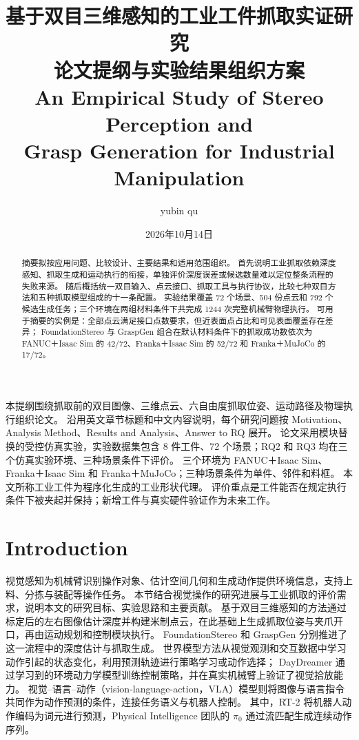 \documentclass[UTF8,fontset=fandol,a4paper,11pt]{ctexart}
\title{基于双目三维感知的工业工件抓取实证研究\\[.3em]
\large 论文提纲与实验结果组织方案\\[.4em]
An Empirical Study of Stereo Perception and\\
Grasp Generation for Industrial Manipulation}
\author{yubin qu}
\date{2026年10月14日}
\newcommand{\qyb}[1]{\textcolor{red!75!black}{#1}}
\begin{document}
\maketitle
\pagestyle{plain}

本提纲围绕抓取前的双目图像、三维点云、六自由度抓取位姿、运动路径及物理执行组织论文。
沿用英文章节标题和中文内容说明，每个研究问题按 Motivation、Analysis Method、Results and Analysis、Answer to RQ 展开。
论文采用模块替换的受控仿真实验，实验数据集包含 8 件工件、72 个场景；RQ2 和 RQ3 均在三个仿真实验环境、三种场景条件下评价。
三个环境为 FANUC＋Isaac Sim、Franka＋Isaac Sim 和 Franka＋MuJoCo；三种场景条件为单件、邻件和料框。
本文所称工业工件为程序化生成的工业形状代理。
评价重点是工件能否在规定执行条件下被夹起并保持；新增工件与真实硬件验证作为未来工作。

\begin{abstract}
摘要拟按应用问题、比较设计、主要结果和适用范围组织。
首先说明工业抓取依赖深度感知、抓取生成和运动执行的衔接，单独评价深度误差或候选数量难以定位整条流程的失败来源。
随后概括统一双目输入、点云接口、抓取工具与执行协议，比较七种双目方法和五种抓取模型组成的十一条配置。
实验结果覆盖 72 个场景、504 份点云和 792 个候选生成任务；三个环境在两组材料条件下共完成 1244 次完整机械臂物理执行。
可用于摘要的实例是：全部点云满足接口点数要求，但近表面点占比和可见表面覆盖存在差异；
FoundationStereo 与 GraspGen 组合在默认材料条件下的抓取成功数依次为 FANUC＋Isaac Sim 的 42/72、Franka＋Isaac Sim 的 52/72 和 Franka＋MuJoCo 的 17/72。
\end{abstract}

\section{\qyb{Introduction}}
\label{sec:intro}

视觉感知为机械臂识别操作对象、估计空间几何和生成动作提供环境信息，支持上料、分拣与装配等操作任务。
本节结合视觉操作的研究进展与工业抓取的评价需求，说明本文的研究目标、实验思路和主要贡献。
基于双目三维感知的方法通过标定后的左右图像估计深度并构建米制点云，在此基础上生成抓取位姿与夹爪开口，再由运动规划和控制模块执行。
FoundationStereo 和 GraspGen 分别推进了这一流程中的深度估计与抓取生成\cite{wen2025,murali2026}。
世界模型方法从视觉观测和交互数据中学习动作引起的状态变化，利用预测轨迹进行策略学习或动作选择；
DayDreamer 通过学习到的环境动力学模型训练控制策略，并在真实机械臂上验证了视觉拾放能力\cite{wu2023daydreamer}。
视觉--语言--动作（vision-language-action，VLA）模型则将图像与语言指令共同作为动作预测的条件，连接任务语义与机器人控制。
其中，RT-2 将机器人动作编码为词元进行预测，Physical Intelligence 团队的 $\pi_0$ 通过流匹配生成连续动作序列\cite{brohan2023rt2,black2025pi0}。
\end{document}
